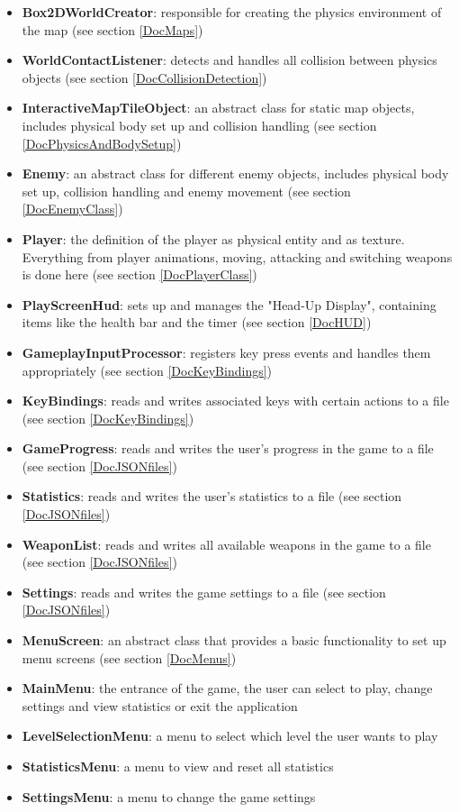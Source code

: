 \documentclass[12p]{article}
\begin{document}
\begin{itemize}
  \item \textbf{Box2DWorldCreator}: responsible for creating the physics environment of the map (see section \ref{DocMaps})
  \item \textbf{WorldContactListener}: detects and handles all collision between physics objects (see section \ref{DocCollisionDetection})
  \item \textbf{InteractiveMapTileObject}: an abstract class for static map objects, includes physical body set up and collision handling (see section \ref{DocPhysicsAndBodySetup})
  \item \textbf{Enemy}: an abstract class for different enemy objects, includes physical body set up, collision handling and enemy movement (see section \ref{DocEnemyClass})
  \item \textbf{Player}: the definition of the player as physical entity and as texture. Everything from player animations, moving, attacking and switching weapons is done here (see section \ref{DocPlayerClass})
  \item \textbf{PlayScreenHud}: sets up and manages the "Head-Up Display", containing items like the health bar and the timer (see section \ref{DocHUD})
  \item \textbf{GameplayInputProcessor}: registers key press events and handles them appropriately (see section \ref{DocKeyBindings})
  \item \textbf{KeyBindings}: reads and writes associated keys with certain actions to a file (see section \ref{DocKeyBindings})
  \item \textbf{GameProgress}: reads and writes the user's progress in the game to a file (see section \ref{DocJSONfiles})
  \item \textbf{Statistics}: reads and writes the user's statistics to a file (see section \ref{DocJSONfiles})
  \item \textbf{WeaponList}: reads and writes all available weapons in the game to a file (see section \ref{DocJSONfiles})
  \item \textbf{Settings}: reads and writes the game settings to a file (see section \ref{DocJSONfiles})
  \item \textbf{MenuScreen}: an abstract class that provides a basic functionality to set up menu screens (see section \ref{DocMenus})
  \item \textbf{MainMenu}: the entrance of the game, the user can select to play, change settings and view statistics or exit the application
  \item \textbf{LevelSelectionMenu}: a menu to select which level the user wants to play
  \item \textbf{StatisticsMenu}: a menu to view and reset all statistics
  \item \textbf{SettingsMenu}: a menu to change the game settings
\end{itemize}
\end{document}
